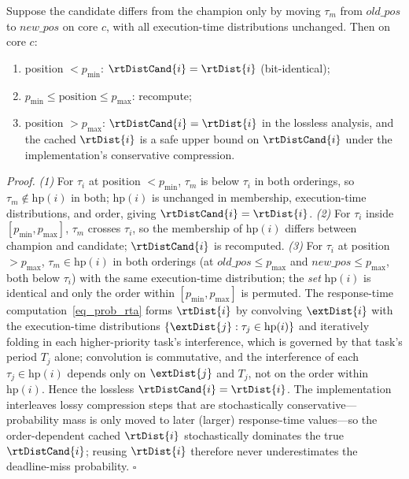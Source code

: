     \begin{lemma}
    \label{lem:rta_priority_move}
    Suppose the candidate differs from the champion only by moving $\tau_m$ from $\mathit{old\_pos}$ to $\mathit{new\_pos}$ on core $c$, with all execution-time distributions unchanged.
    Then on core $c$:
    \begin{enumerate}
        \item position $< p_{\min}$: $\rtDistCand{i} = \rtDist{i}$ (bit-identical);
        \item $p_{\min} \leq \text{position} \leq p_{\max}$: recompute;
        \item position $> p_{\max}$: $\rtDistCand{i} = \rtDist{i}$ in the lossless analysis, and the cached $\rtDist{i}$ is a safe upper bound on $\rtDistCand{i}$ under the implementation's conservative compression.
    \end{enumerate}
    \end{lemma}
    \noindent\textit{Proof.}
    \emph{(1)} For $\tau_i$ at position $< p_{\min}$, $\tau_m$ is below $\tau_i$ in both orderings, so $\tau_m \notin \text{hp}(i)$ in both; $\text{hp}(i)$ is unchanged in membership, execution-time distributions, and order, giving $\rtDistCand{i}=\rtDist{i}$.
    \emph{(2)} For $\tau_i$ inside $[p_{\min},p_{\max}]$, $\tau_m$ crosses $\tau_i$, so the membership of $\text{hp}(i)$ differs between champion and candidate; $\rtDistCand{i}$ is recomputed.
    \emph{(3)} For $\tau_i$ at position $> p_{\max}$, $\tau_m \in \text{hp}(i)$ in both orderings (at $\mathit{old\_pos} \leq p_{\max}$ and $\mathit{new\_pos} \leq p_{\max}$, both below $\tau_i$) with the same execution-time distribution; the \emph{set} $\text{hp}(i)$ is identical and only the order within $[p_{\min},p_{\max}]$ is permuted.
    The response-time computation~\eqref{eq_prob_rta} forms $\rtDist{i}$ by convolving $\extDist{i}$ with the execution-time distributions $\{\extDist{j} : \tau_j \in \text{hp}(i)\}$ and iteratively folding in each higher-priority task's interference, which is governed by that task's period $T_j$ alone; convolution is commutative, and the interference of each $\tau_j \in \text{hp}(i)$ depends only on $\extDist{j}$ and $T_j$, not on the order within $\text{hp}(i)$. Hence the lossless $\rtDistCand{i}=\rtDist{i}$.
    The implementation interleaves lossy compression steps that are stochastically conservative---probability mass is only moved to later (larger) response-time values---so the order-dependent cached $\rtDist{i}$ stochastically dominates the true $\rtDistCand{i}$; reusing $\rtDist{i}$ therefore never underestimates the deadline-miss probability. \hfill$\square$

